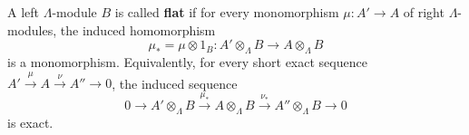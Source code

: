 A left $\Lambda$-module $B$ is called \textbf{flat} if for every monomorphism $\mu : A' \to A$ of right $\Lambda$-modules, the induced homomorphism
$$
\mu_* = \mu \otimes 1_B : A' \otimes_\Lambda B \to A \otimes_\Lambda B
$$
is a monomorphism. Equivalently, for every short exact sequence $A' \xrightarrow{\mu} A \xrightarrow{\nu} A'' \to 0$, the induced sequence
$$
0 \to A' \otimes_\Lambda B \xrightarrow{\mu_*} A \otimes_\Lambda B \xrightarrow{\nu_*} A'' \otimes_\Lambda B \to 0
$$
is exact.
